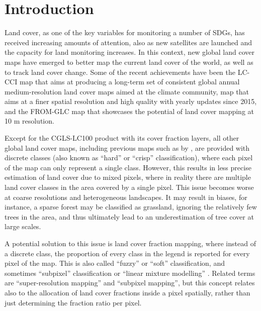 \documentclass[review,authoryear,3p]{elsarticle}
\begin{document}

\section{Introduction}

Land cover, as one of the key variables for monitoring a number of \glspl{SDG}, has received increasing amounts of attention, also as new satellites are launched and the capacity for land monitoring increases.
In this context, new global land cover maps have emerged to better map the current land cover of the world, as well as to track land cover change.
Some of the recent achievements have been the \ac{LC-CCI} map \citep{defourny2012cci} that aims at producing a long-term set of consistent global annual medium-resolution land cover maps aimed at the climate community,  map \citep{buchhorn_moderate_2019, buchhorn_copernicus_2020} that aims at a finer spatial resolution and high quality with yearly updates since 2015, and the \ac{FROM-GLC} map \citep{fromglc2019} that showcases the potential of land cover mapping at 10 m resolution.

Except for the \ac{CGLS-LC100} product with its cover fraction layers, all other global land cover maps, including previous maps such as by \citet{bartholome2005glc2000, friedl2010modis, arino2007globcover, see2015hybrid, chen2015globeland30}, are provided with discrete classes (also known as ``hard'' or ``crisp'' classification), where each pixel of the map can only represent a single class.
However, this results in less precise estimation of land cover due to mixed pixels, where in reality there are multiple land cover classes in the area covered by a single pixel.
This issue becomes worse at coarse resolutions and heterogeneous landscapes.
It may result in biases, for instance, a sparse forest may be classified as grassland, ignoring the relatively few trees in the area, and thus ultimately lead to an underestimation of tree cover at large scales.

A potential solution to this issue is land cover fraction mapping, where instead of a discrete class, the proportion of every class in the legend is reported for every pixel of the map.
This is also called ``fuzzy'' or ``soft'' classification, and sometimes ``subpixel'' classification or ``linear mixture modelling'' \citep{Okeke2006fuzzyexponent}.
Related terms are ``super-resolution mapping'' and ``subpixel mapping'', but this concept relates also to the allocation of land cover fractions inside a pixel spatially, rather than just determining the fraction ratio per pixel.
\end{document}
